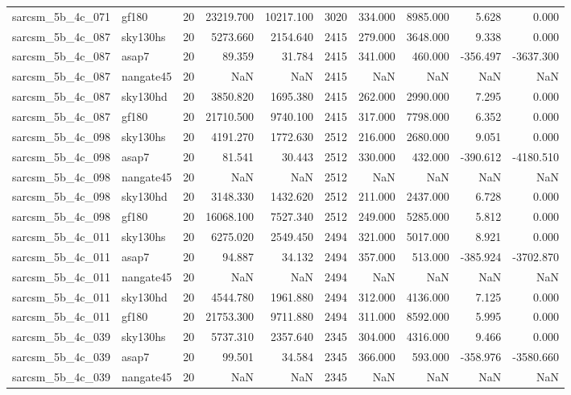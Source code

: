 \begin{tabular}{llrrrrrrrr}
sarcsm\_5b\_4c\_071 & gf180 & 20 & 23219.700 & 10217.100 & 3020 & 334.000 & 8985.000 & 5.628 & 0.000 \\
sarcsm\_5b\_4c\_087 & sky130hs & 20 & 5273.660 & 2154.640 & 2415 & 279.000 & 3648.000 & 9.338 & 0.000 \\
sarcsm\_5b\_4c\_087 & asap7 & 20 & 89.359 & 31.784 & 2415 & 341.000 & 460.000 & -356.497 & -3637.300 \\
sarcsm\_5b\_4c\_087 & nangate45 & 20 & NaN & NaN & 2415 & NaN & NaN & NaN & NaN \\
sarcsm\_5b\_4c\_087 & sky130hd & 20 & 3850.820 & 1695.380 & 2415 & 262.000 & 2990.000 & 7.295 & 0.000 \\
sarcsm\_5b\_4c\_087 & gf180 & 20 & 21710.500 & 9740.100 & 2415 & 317.000 & 7798.000 & 6.352 & 0.000 \\
sarcsm\_5b\_4c\_098 & sky130hs & 20 & 4191.270 & 1772.630 & 2512 & 216.000 & 2680.000 & 9.051 & 0.000 \\
sarcsm\_5b\_4c\_098 & asap7 & 20 & 81.541 & 30.443 & 2512 & 330.000 & 432.000 & -390.612 & -4180.510 \\
sarcsm\_5b\_4c\_098 & nangate45 & 20 & NaN & NaN & 2512 & NaN & NaN & NaN & NaN \\
sarcsm\_5b\_4c\_098 & sky130hd & 20 & 3148.330 & 1432.620 & 2512 & 211.000 & 2437.000 & 6.728 & 0.000 \\
sarcsm\_5b\_4c\_098 & gf180 & 20 & 16068.100 & 7527.340 & 2512 & 249.000 & 5285.000 & 5.812 & 0.000 \\
sarcsm\_5b\_4c\_011 & sky130hs & 20 & 6275.020 & 2549.450 & 2494 & 321.000 & 5017.000 & 8.921 & 0.000 \\
sarcsm\_5b\_4c\_011 & asap7 & 20 & 94.887 & 34.132 & 2494 & 357.000 & 513.000 & -385.924 & -3702.870 \\
sarcsm\_5b\_4c\_011 & nangate45 & 20 & NaN & NaN & 2494 & NaN & NaN & NaN & NaN \\
sarcsm\_5b\_4c\_011 & sky130hd & 20 & 4544.780 & 1961.880 & 2494 & 312.000 & 4136.000 & 7.125 & 0.000 \\
sarcsm\_5b\_4c\_011 & gf180 & 20 & 21753.300 & 9711.880 & 2494 & 311.000 & 8592.000 & 5.995 & 0.000 \\
sarcsm\_5b\_4c\_039 & sky130hs & 20 & 5737.310 & 2357.640 & 2345 & 304.000 & 4316.000 & 9.466 & 0.000 \\
sarcsm\_5b\_4c\_039 & asap7 & 20 & 99.501 & 34.584 & 2345 & 366.000 & 593.000 & -358.976 & -3580.660 \\
sarcsm\_5b\_4c\_039 & nangate45 & 20 & NaN & NaN & 2345 & NaN & NaN & NaN & NaN \\

\end{tabular}
